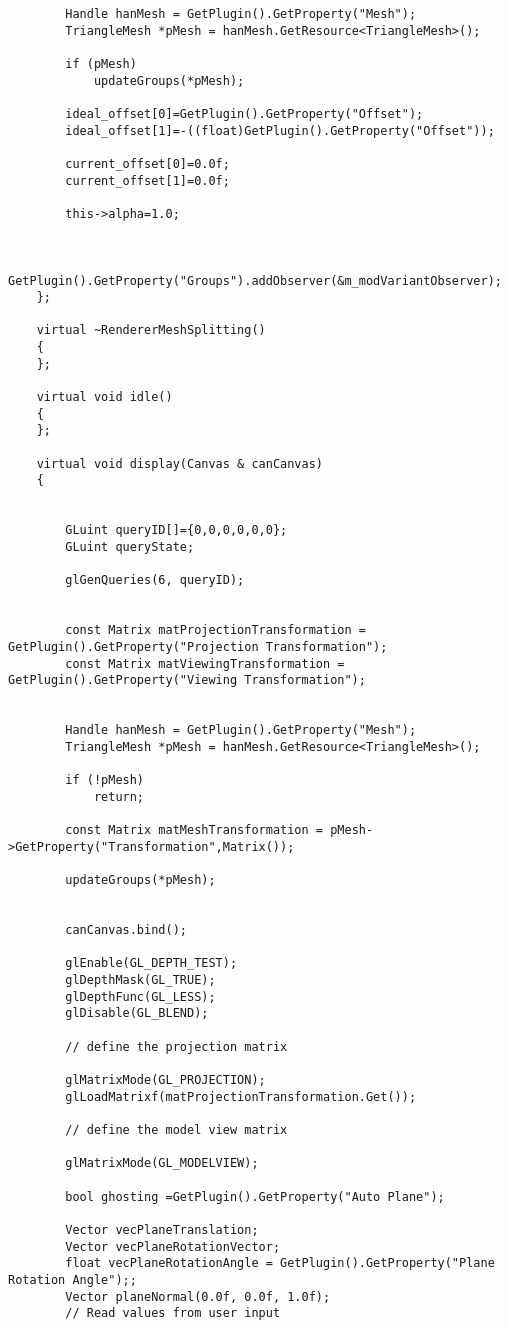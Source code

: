 \begin{verbatim}
		Handle hanMesh = GetPlugin().GetProperty("Mesh");
		TriangleMesh *pMesh = hanMesh.GetResource<TriangleMesh>();

		if (pMesh)
			updateGroups(*pMesh);

		ideal_offset[0]=GetPlugin().GetProperty("Offset");
		ideal_offset[1]=-((float)GetPlugin().GetProperty("Offset"));

		current_offset[0]=0.0f;
		current_offset[1]=0.0f;

		this->alpha=1.0;


		GetPlugin().GetProperty("Groups").addObserver(&m_modVariantObserver);
	};

	virtual ~RendererMeshSplitting()
	{
	};

	virtual void idle()
	{
	};

	virtual void display(Canvas & canCanvas)
	{


		GLuint queryID[]={0,0,0,0,0,0};
		GLuint queryState;

		glGenQueries(6, queryID);


		const Matrix matProjectionTransformation = GetPlugin().GetProperty("Projection Transformation");
		const Matrix matViewingTransformation = GetPlugin().GetProperty("Viewing Transformation");


		Handle hanMesh = GetPlugin().GetProperty("Mesh");
		TriangleMesh *pMesh = hanMesh.GetResource<TriangleMesh>();

		if (!pMesh)
			return;

		const Matrix matMeshTransformation = pMesh->GetProperty("Transformation",Matrix());

		updateGroups(*pMesh);


		canCanvas.bind();

		glEnable(GL_DEPTH_TEST);
		glDepthMask(GL_TRUE);
		glDepthFunc(GL_LESS);
		glDisable(GL_BLEND);

		// define the projection matrix

		glMatrixMode(GL_PROJECTION);
		glLoadMatrixf(matProjectionTransformation.Get());

		// define the model view matrix

		glMatrixMode(GL_MODELVIEW);

		bool ghosting =GetPlugin().GetProperty("Auto Plane");

		Vector vecPlaneTranslation;
		Vector vecPlaneRotationVector;
		float vecPlaneRotationAngle = GetPlugin().GetProperty("Plane Rotation Angle");;
		Vector planeNormal(0.0f, 0.0f, 1.0f);
		// Read values from user input
		

\end{verbatim}
